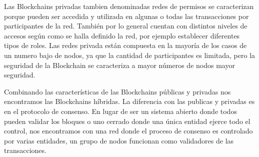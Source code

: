 Las  Blockchains privadas tambien denominadas redes de permisos se caracterizan porque  pueden ser accedida y utilizada en algunas o todas las transacciones
por participantes de la red.  También por lo general cuentan con  distintos niveles de accesos según como se halla definido la red, por ejemplo establecer 
diferentes tipos de roles.
Las redes privada están compuesta en la mayoría de los casos de un numero bajo de nodos, ya que la cantidad de participantes 
es limitada, pero la seguridad de la  Blockchain se caracteriza  a mayor números de nodos mayor seguridad. \cite[]{torres_Blockchain_nodate}

Combinando las características de las Blockchains públicas y privadas nos encontramos las
Blockchains híbridas. La  diferencia con las publicas y privadas  es 
en el protocolo de consenso. En lugar de ser un sistema abierto donde todos pueden validar los
bloques o uno cerrado donde una única entidad ejerce todo el control, nos encontramos con una
red donde el proceso de consenso es controlado por varias entidades, un grupo de nodos
funcionan como validadores de las transacciones.\cite[]{torres_Blockchain_nodate}




